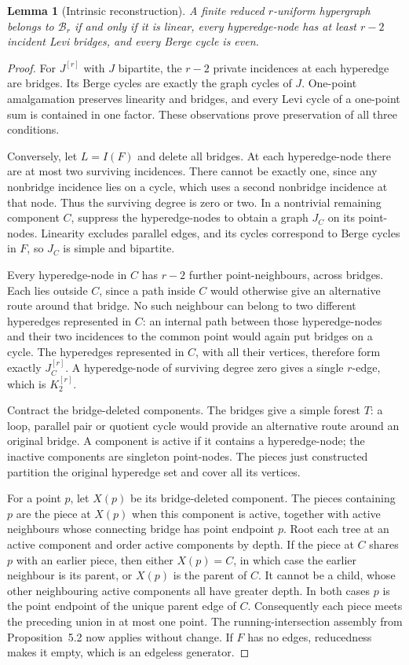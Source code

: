 \documentclass[a4paper,11pt,reqno]{amsart}
\theoremstyle{plain}
\newtheorem{lemma}[theorem]{Lemma}
\theoremstyle{definition}
\theoremstyle{remark}
\begin{document}
\begin{lemma}[Intrinsic reconstruction]
\label{uniform-intrinsic-equivalence}
A finite reduced $r$-uniform hypergraph belongs to $\mathcal B_r$ if and
only if it is linear, every hyperedge-node has at least $r-2$ incident
Levi bridges, and every Berge cycle is even.
\end{lemma}
\begin{proof}
For $J^{[r]}$ with $J$ bipartite, the $r-2$ private incidences at each
hyperedge are bridges.  Its Berge cycles are exactly the graph cycles of
$J$.  One-point amalgamation preserves linearity and bridges, and every
Levi cycle of a one-point sum is contained in one factor.  These
observations prove preservation of all three conditions.

Conversely, let $L=I(F)$ and delete all bridges.  At each hyperedge-node
there are at most two surviving incidences.  There cannot be exactly one,
since any nonbridge incidence lies on a cycle, which uses a second
nonbridge incidence at that node.  Thus the surviving degree is zero or
two.  In a nontrivial remaining component $C$, suppress the hyperedge-nodes
to obtain a graph $J_C$ on its point-nodes.  Linearity excludes parallel
edges, and its cycles correspond to Berge cycles in $F$, so $J_C$ is
simple and bipartite.

Every hyperedge-node in $C$ has $r-2$ further point-neighbours, across
bridges.  Each lies outside $C$, since a path inside $C$ would otherwise
give an alternative route around that bridge.  No such neighbour can
belong to two different hyperedges represented in $C$: an internal path
between those hyperedge-nodes and their two incidences to the common
point would again put bridges on a cycle.  The hyperedges represented in
$C$, with all their vertices, therefore form exactly $J_C^{[r]}$.
A hyperedge-node of surviving degree zero gives a single $r$-edge,
which is $K_2^{[r]}$.

Contract the bridge-deleted components.  The bridges give a simple forest
$T$: a loop, parallel pair or quotient cycle would provide an alternative
route around an original bridge.  A component is active if it contains a
hyperedge-node; the inactive components are singleton point-nodes.  The
pieces just constructed partition the original hyperedge set and cover
all its vertices.

For a point $p$, let $X(p)$ be its bridge-deleted component.  The pieces
containing $p$ are the piece at $X(p)$ when this component is active,
together with active neighbours whose connecting bridge has point
endpoint $p$.  Root each tree at an active component and order active
components by depth.  If the piece at $C$ shares $p$ with an earlier
piece, then either $X(p)=C$, in which case the earlier neighbour is its
parent, or $X(p)$ is the parent of $C$.  It cannot be a child, whose
other neighbouring active components all have greater depth.  In both
cases $p$ is the point endpoint of the unique parent edge of $C$.
Consequently each piece meets the preceding union in at most one point.
The running-intersection assembly from Proposition~5.2 now applies
without change.  If $F$ has no edges, reducedness makes it empty, which
is an edgeless generator.
\end{proof}
\end{document}
